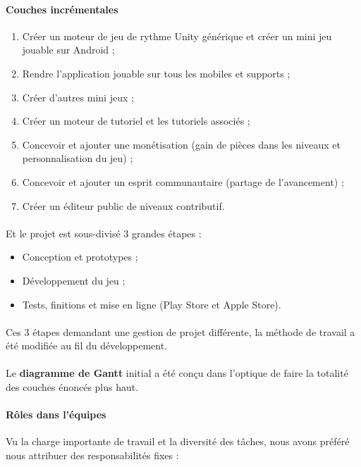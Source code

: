 \paragraph{Couches incrémentales}
\begin{enumerate}
\item Créer un moteur de jeu de rythme Unity générique et créer un mini jeu jouable sur Android ;
\item Rendre l’application jouable sur tous les mobiles et supports ;
\item Créer d’autres mini jeux ;
\item Créer un moteur de tutoriel et les tutoriels associés ;
\item Concevoir et ajouter une monétisation (gain de pièces dans les niveaux et personnalisation du jeu) ;
\item Concevoir et ajouter un esprit communautaire (partage de l’avancement) ;
\item Créer un éditeur public de niveaux contributif.
\end{enumerate}

\paragraph{}
Et le projet est sous-divisé 3 grandes étapes :
\begin{itemize}
\item Conception et prototypes ;
\item Développement du jeu ;
\item Tests, finitions et mise en ligne (Play Store et Apple Store).
\end{itemize}

\paragraph{}
Ces 3 étapes demandant une gestion de projet différente, la méthode de travail a été modifiée au fil du développement.

\paragraph{}
Le \textbf{diagramme de Gantt} initial a été conçu dans l’optique de faire la totalité des couches énoncés plus haut.

\paragraph{Rôles dans l’équipes}
Vu la charge importante de travail et la diversité des tâches, nous avons préféré nous attribuer des responsabilités fixes :

